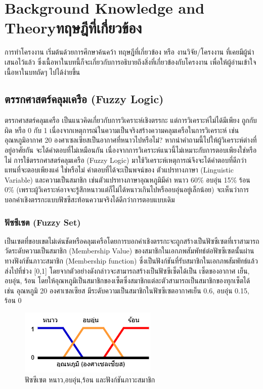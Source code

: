 \chapter{\ifenglish Background Knowledge and Theory\else ทฤษฎีที่เกี่ยวข้อง\fi}

การทำโครงงาน เริ่มต้นด้วยการศึกษาค้นคว้า ทฤษฎีที่เกี่ยวข้อง หรือ งานวิจัย/โครงงาน ที่เคยมีผู้นำเสนอไว้แล้ว ซึ่งเนื้อหาในบทนี้ก็จะเกี่ยวกับการอธิบายถึงสิ่งที่เกี่ยวข้องกับโครงงาน เพื่อให้ผู้อ่านเข้าใจเนื้อหาในบทถัดๆ ไปได้ง่ายขึ้น

\section{ตรรกศาสตร์คลุมเครือ (Fuzzy Logic)}
ตรรกศาสตร์คลุมเครือ เป็นแนวคิดเกี่ยวกับการวิเคราะห์เชิงตรรกะ แต่การวิเคราะห์ไม่ได้มีเพียง ถูกกับผิด หรือ 0 กับ 1 เนื่องจากเหตุการณ์ในความเป็นจริงสร้างความคลุมเครือในการวิเคราะห์ เช่น อุณหภูมิอากาศ 20 องศาเซลเซียสเป็นอากาศที่หนาวไปหรือไม่? หากนำคำถามนี้ไปให้ผู้วิเคราะห์ต่างที่อยู่อาศัยกัน จะได้คำตอบที่ไม่เหมือนกัน เนื่องจากการวิเคราะห์แนวนี้ไม่เหมาะกับการตอบเพียงใช่หรือไม่ การใช้ตรรกศาสตร์คลุมเครือ (Fuzzy Logic) มาใช้วิเคราะห์เหตุการณ์จึงจะได้คำตอบที่ดีกว่า แทนที่จะตอบเพียงแค่ ใช่หรือไม่ คำตอบที่ได้จะเป็นพจน์ของ ตัวแปรทางภาษา (Linguistic Variable) และความเป็นสมาชิก เช่นตัวแปรทางภาษาอุณหภูมิมีค่า หนาว 60\% อบอุ่น 15\% ร้อน 0\% (เพราะผู้วิเคราะห์อาจจะรู้สึกหนาวแต่ก็ไม่ได้หนาวเกินไปหรืออบอุ่นอยู่เล็กน้อย) จะเห็นว่าการบอกค่าเชิงตรรกะแบบฟัซซีสะท้อนความจริงได้ดีกว่าการตอบแบบเดิม


\subsection{ฟัซซีเซต (Fuzzy Set)}
เป็นเซตที่ขอบเขตไม่เด่นชัดหรือคลุมเครือโดยการบอกค่าเชิงตรรกะจะถูกสร้างเป็นฟัซซีเซตที่เราสามารถวัดระดับความเป็นสมาชิก (Membership Value) ของสมาชิกในเอกภพสัมพัทธ์ต่อฟัซซีเซตนั้นผ่านทางฟังก์ชันภาวะสมาชิก (Membership function) ซึ่งเป็นฟังก์ชันที่รับสมาชิกในเอกภพสัมพัทธ์แล้วส่งไปที่ช่วง [0,1] โดยจากตัวอย่างดังกล่าวจะสามารถสร้างเป็นฟัซซีเซ็ตได้เป็น เซ็ตของอากาศ เย็น, อบอุ่น, ร้อน โดยให้อุณหภูมิเป็นสมาชิกของเซ็ตซึ่งสมาชิกแต่ละตัวสามารถเป็นสมาชิกของทุกเซ็ตได้ เช่น อุณหภูมิ 20 องศาเซลเซียส มีระดับความเป็นสมาชิกในฟัซซีเซตอากาศเย็น 0.6, อบอุ่น 0.15, ร้อน 0
\begin{figure}[ht]
    \centering
    \includegraphics[scale=0.7]{images/fuzzy_set.png}
    \caption{ฟัซซีเซต หนาว,อบอุ่น,ร้อน และฟังก์ชันภาวะสมาชิก}
    \label{fig:4}
\end{figure}

